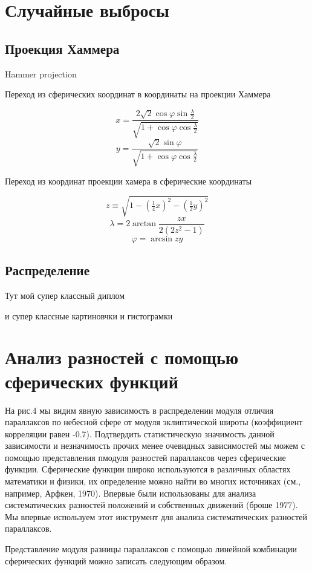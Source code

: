 \documentclass[14pt]{article} %
\begin{document}
\section{Случайные выбросы}\label{errvid}

\subsection{Проекция Хаммера}\label{sub:smthrs}

Hammer projection

Переход из сферических координат в координаты на проекции Хаммера

$$ x = \frac{2 \sqrt 2 \cos \varphi \sin \frac{\lambda}{2}}{\sqrt{1 + \cos \varphi \cos \frac{\lambda}{2}}} $$
$$y = \frac{\sqrt 2\sin \varphi}{\sqrt{1 + \cos \varphi \cos \frac{\lambda}{2}}}$$

Переход из координат проекции хамера в сферические координаты

$$z \equiv \sqrt{1 - \left(\tfrac14 x\right)^2 - \left(\tfrac12 y\right)^2}$$
$$ \lambda = 2 \arctan \frac{zx}{2\left(2z^2 - 1\right)} $$
$$ \varphi = \arcsin zy $$


\subsection{Распределение}\label{sub:smthrs}
Тут мой супер классный диплом

и супер классные картиновчки и гистограмки


\section{Анализ разностей с помощью сферических функций}\label{sistem}
 На рис.4 мы видим явную зависимость в распределении модуля отличия параллаксов по небесной сфере от модуля эклиптической широты (коэффициент корреляции равен -0.7).  Подтвердить статистическую значимость данной зависимости и незначимость прочих менее очевидных зависимостей мы можем с помощью представления пмодуля разностей параллаксов через сферические функции. Сферические функции широко используются в различных областях математики и физики, их определение можно найти во многих источниках (см., например, Арфкен, 1970). Впервые  были использованы для анализа систематических разностей положений и собственных движений (броше 1977). Мы впервые используем этот инструмент для анализа систематических разностей параллаксов.
 
Представление модуля разницы параллаксов с помощью линейной комбинации сферических функций можно записать следующим образом.
\end{document}
